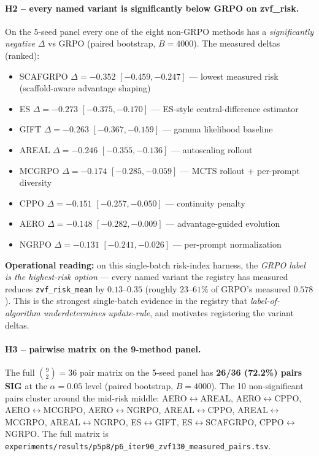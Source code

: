 \paragraph{H2 -- every named variant is significantly below GRPO on zvf\_risk.}
On the 5-seed panel every one of the eight non-GRPO methods has a
\emph{significantly negative} $\Delta$ vs GRPO (paired bootstrap, $B{=}4000$).
The measured deltas (ranked):
\begin{itemize}\itemsep0pt
\item SCAFGRPO $\Delta{=}{-}0.352$ $[-0.459, {-}0.247]$ --- lowest measured risk (scaffold-aware advantage shaping)
\item ES       $\Delta{=}{-}0.273$ $[-0.375, {-}0.170]$ --- ES-style central-difference estimator
\item GIFT     $\Delta{=}{-}0.263$ $[-0.367, {-}0.159]$ --- gamma likelihood baseline
\item AREAL    $\Delta{=}{-}0.246$ $[-0.355, {-}0.136]$ --- autoscaling rollout
\item MCGRPO   $\Delta{=}{-}0.174$ $[-0.285, {-}0.059]$ --- MCTS rollout + per-prompt diversity
\item CPPO     $\Delta{=}{-}0.151$ $[-0.257, {-}0.050]$ --- continuity penalty
\item AERO     $\Delta{=}{-}0.148$ $[-0.282, {-}0.009]$ --- advantage-guided evolution
\item NGRPO    $\Delta{=}{-}0.131$ $[-0.241, {-}0.026]$ --- per-prompt normalization
\end{itemize}
\textbf{Operational reading:} on this single-batch risk-index harness, the
\emph{GRPO label is the highest-risk option} --- every named variant the
registry has measured reduces \texttt{zvf\_risk\_mean} by $0.13$--$0.35$
(roughly $23$--$61\%$ of GRPO's measured $0.578$). This is the strongest
single-batch evidence in the registry that \emph{label-of-algorithm
underdetermines update-rule}, and motivates registering the variant deltas.

\paragraph{H3 -- pairwise matrix on the 9-method panel.}
The full $\binom{9}{2}{=}36$ pair matrix on the 5-seed panel has
\textbf{26/36 (72.2\%) pairs SIG} at the $\alpha{=}0.05$ level (paired
bootstrap, $B{=}4000$). The 10 non-significant pairs cluster around the
mid-risk middle: AERO$\leftrightarrow$AREAL,
AERO$\leftrightarrow$CPPO, AERO$\leftrightarrow$MCGRPO,
AERO$\leftrightarrow$NGRPO, AREAL$\leftrightarrow$CPPO,
AREAL$\leftrightarrow$MCGRPO, AREAL$\leftrightarrow$NGRPO,
ES$\leftrightarrow$GIFT, ES$\leftrightarrow$SCAFGRPO,
CPPO$\leftrightarrow$NGRPO. The full matrix is
\texttt{experiments/results/p5p8/p6\_iter90\_zvf130\_measured\_pairs.tsv}.

